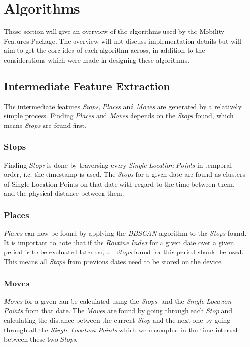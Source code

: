 \section{Algorithms}
These section will give an overview of the algorithms used by the Mobility Features Package. The overview will not discuss implementation details but will aim to get the core idea of each algorithm across, in addition to the considerations which were made in designing these algorithms.

\subsection{Intermediate Feature Extraction}
The intermediate features \textit{Stops}, \textit{Places} and \textit{Moves} are generated by a relatively simple process. Finding \textit{Places} and \textit{Moves} depends on the \textit{Stops} found, which means \textit{Stops} are found first. 

\subsubsection*{Stops}
Finding \textit{Stops} is done by traversing every \textit{Single Location Points} in temporal order, i.e. the timestamp is used. The \textit{Stops} for a given date are found as clusters of Single Location Points on that date with regard to the time between them, and the physical distance between them. 

\subsubsection*{Places}
\textit{Places} can now be found by applying the \textit{DBSCAN} algorithm to the \textit{Stops} found. It is important to note that if the \textit{Routine Index} for a given date over a given period is to be evaluated later on, all \textit{Stops} found for this period should be used. This means all \textit{Stops} from previous dates need to be stored on the device. 

\subsubsection*{Moves}
\textit{Moves} for a given can be calculated using the \textit{Stops}- and the \textit{Single Location Points} from that date. The \textit{Moves} are found by going through each \textit{Stop} and calculating the distance between the current \textit{Stop} and the next one by going through all the \textit{Single Location Points} which were sampled in the time interval between these two \textit{Stops}.

